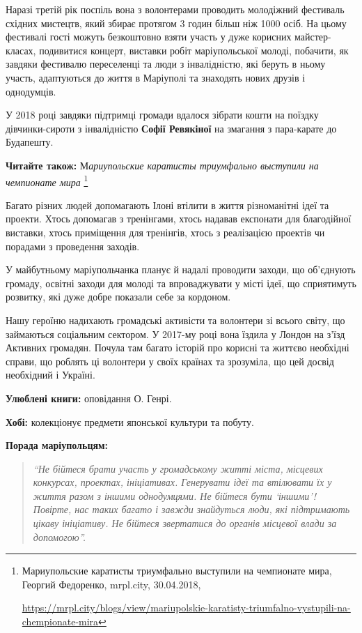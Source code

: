 Наразі третій рік поспіль вона з волонтерами проводить молодіжний фестиваль
східних мистецтв, який збирає протягом 3 годин більш ніж 1000 осіб. На цьому
фестивалі гості можуть безкоштовно взяти участь у дуже корисних майстер-класах,
подивитися концерт, виставки робіт маріупольської молоді, побачити, як завдяки
фестивалю переселенці та люди з інвалідністю, які беруть в ньому участь,
адаптуються до життя в Маріуполі та знаходять нових друзів і однодумців.

У 2018 році завдяки підтримці громади вдалося зібрати кошти на поїздку
дівчинки-сироти з інвалідністю \textbf{Софії Ревякіної} на змагання з пара-карате до
Будапешту.

\textbf{Читайте також:} М\emph{ариупольские каратисты триумфально выступили на чемпионате мира}%
\footnote{Мариупольские каратисты триумфально выступили на чемпионате мира, Георгий Федоренко, mrpl.city, 30.04.2018, \par%
\url{https://mrpl.city/blogs/view/mariupolskie-karatisty-triumfalno-vystupili-na-chempionate-mira}
}


Багато різних людей допомагають Ілоні втілити в життя різноманітні ідеї та
проекти. Хтось допомагав з тренінгами, хтось надавав експонати для благодійної
виставки, хтось приміщення для тренінгів, хтось з реалізацією проектів чи
порадами з проведення заходів.

У майбутньому маріупольчанка планує й надалі проводити заходи, що об'єднують
громаду, освітні заходи для молоді та впроваджувати у місті ідеї, що
сприятимуть розвитку, які дуже добре показали себе за кордоном.

Нашу героїню надихають громадські активісти та волонтери зі всього світу, що
займаються соціальним сектором. У 2017-му році вона їздила у Лондон на з'їзд
Активних громадян. Почула там багато історій про корисні та життєво необхідні
справи, що роблять ці волонтери у своїх країнах та зрозуміла, що цей досвід
необхідний і Україні.


\textbf{Улюблені книги:} оповідання О. Генрі.

\textbf{Хобі:} колекціонує предмети японської культури та побуту.

\textbf{Порада маріупольцям:} 

\begin{quote}
\em\enquote{Не бійтеся брати участь у громадському житті міста, місцевих конкурсах,
проектах, ініціативах. Генерувати ідеї та втілювати їх у життя разом з іншими
однодумцями. Не бійтеся бути \enquote{іншими}! Повірте, нас таких багато і завжди
знайдуться люди, які підтримають цікаву ініціативу. Не бійтеся звертатися до
органів місцевої влади за допомогою}.
\end{quote}

